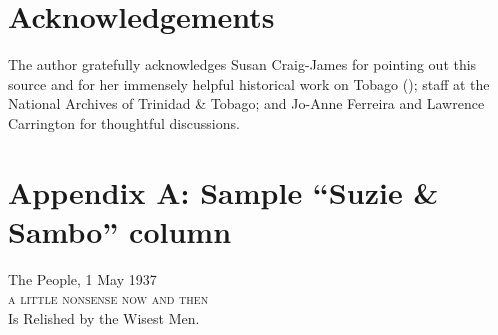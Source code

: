 \documentclass[output=paper,colorlinks,citecolor=brown]{langscibook}
\begin{document}
\section*{Acknowledgements}
The author gratefully acknowledges Susan Craig-James for pointing out this source and for her immensely helpful historical work on Tobago (\citeyear{craigjames2008}); staff at the National Archives of Trinidad \& Tobago; and Jo-Anne Ferreira and Lawrence Carrington for thoughtful discussions.


\printbibliography[heading=subbibliography,notkeyword=this]

\section*{Appendix A: Sample “Suzie \& Sambo” column}

The People, 1 May 1937\\
\textsc{a little nonsense now and then}\\
Is Relished by the Wisest Men.
\end{document}
